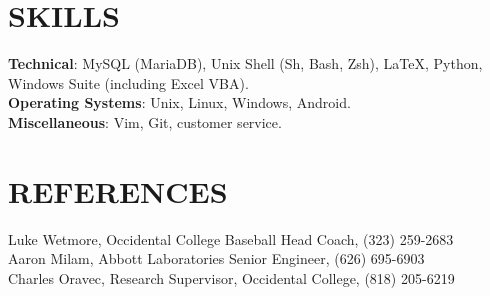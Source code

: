 \documentclass[margin]{res}
\begin{document}
\begin{resume}
\section{SKILLS}

\textbf{Technical}: MySQL (MariaDB), Unix Shell (Sh, Bash, Zsh), \LaTeX, Python, Windows Suite (including Excel VBA).
\\
\textbf{Operating Systems}: Unix, Linux, Windows, Android.
\\
\textbf{Miscellaneous}: Vim, Git, customer service.

\section{REFERENCES}
Luke Wetmore, Occidental College Baseball Head Coach, (323) 259-2683 \\
Aaron Milam, Abbott Laboratories Senior Engineer, (626) 695-6903 \\
Charles Oravec, Research Supervisor, Occidental College, (818) 205-6219
\end{resume}
\end{document}
